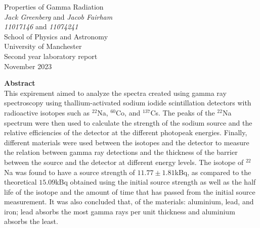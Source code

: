 \documentclass[11pt]{article} %
\begin{document}


\begin{titlepage} %
\begin{center} %

{\Huge Properties of Gamma Radiation}\\[0.5cm] %
\textit{Jack Greenberg} and \textit{Jacob Fairham}~\\[0.3cm] %
\textit{11017146} and \textit{11074241}~\\[0.3cm]
School of Physics and Astronomy~\\[0.3cm]
University of Manchester~\\[0.3cm]
Second year laboratory report~\\[0.3cm]
November 2023~\\[2cm]


\end{center}
{\Large \textbf{Abstract}}~\\[0.3cm]
 This expirement aimed to analyze the spectra created using gamma ray spectroscopy using thallium-activated sodium iodide scintillation detectors with radioactive isotopes such as $^{22}$Na, $^{60}$Co, and $^{137}$Cs. The peaks of the $^{22}$Na spectrum were then used to calculate the strength of the sodium source and the relative efficiencies of the detector at the different photopeak energies. Finally, different materials were used between the isotopes and the detector to measure the relation between gamma ray detections and the thickness of the barrier between the source and the detector at different energy levels. The isotope of $^{22}$Na was found to have a source strength of $11.77\pm1.81$kBq, as compared to the theoretical $15.09$kBq obtained using the initial source strength as well as the half life of the isotope and the amount of time that has passed from the initial source measurement. It was also concluded that, of the materials: aluminium, lead, and iron; lead absorbs the most gamma rays per unit thickness and aluminium absorbs the least.

\end{titlepage}
\clearpage
{} %
\setcounter{page}{2} %
\end{document}
